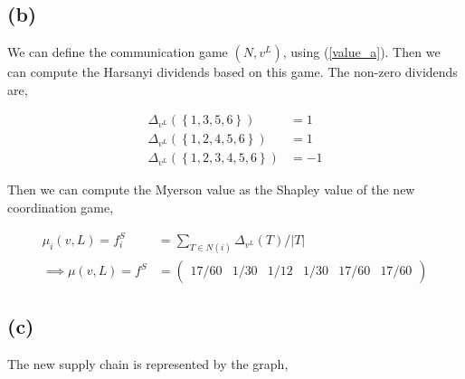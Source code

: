 \documentclass[american]{scrartcl}
\newcommand{\set}[1]{\left\{#1\right\}}
\newcommand{\abs}[1]{\left\lvert #1 \right\rvert}
\begin{document}
\subsection*{(b)}

We can define the communication game $(N, v^L)$, using (\ref{value_a}). Then we can compute the Harsanyi dividends based on this game. The non-zero dividends are,

\begin{equation}
    \begin{split}
        \Delta_{v^L}(\set{1, 3, 5, 6}) &= 1 \\
        \Delta_{v^L}(\set{1, 2, 4, 5, 6}) &= 1 \\
        \Delta_{v^L}(\set{1, 2, 3, 4, 5, 6}) &= -1
    \end{split}
\end{equation}

Then we can compute the Myerson value as the Shapley value of the new coordination game,

\begin{equation} \label{myerson_complete}
    \begin{split}
        \mu_i(v, L) = f_i^S &= \sum_{T \in N(i)} \Delta_{v^L}(T) / \abs{T} \\
        \implies \mu(v, L) = f^S &= \begin{pmatrix}
            17/60 & 1/30 & 1/12 & 1/30 & 17/60 & 17/60
        \end{pmatrix}
    \end{split}
\end{equation}

\subsection*{(c)}

The new supply chain is represented by the graph,

\vspace{1cm}
\begin{center}
\end{center}
\end{document}
